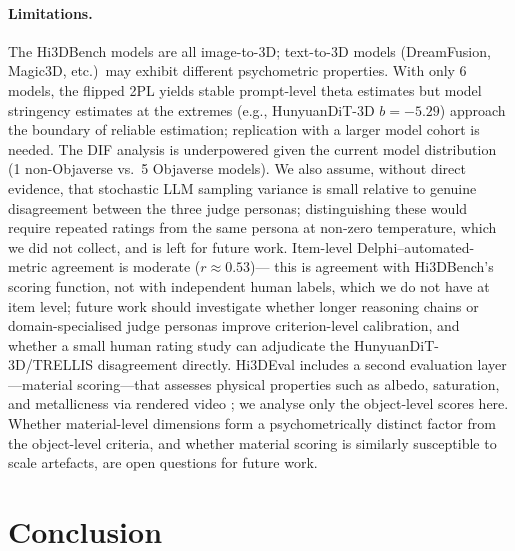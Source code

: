 \documentclass[10pt]{article}
\begin{document}
\paragraph{Limitations.}
The Hi3DBench models are all image-to-3D; text-to-3D models (DreamFusion,
Magic3D, etc.)\ may exhibit different psychometric properties.
With only 6 models, the flipped 2PL yields stable prompt-level theta estimates
but model stringency estimates at the extremes (e.g., HunyuanDiT-3D $b=-5.29$)
approach the boundary of reliable estimation; replication with a larger model
cohort is needed.
The DIF analysis is underpowered given the current model distribution (1
non-Objaverse vs.\ 5 Objaverse models).
We also assume, without direct evidence, that stochastic LLM sampling
variance is small relative to genuine disagreement between the three
judge personas; distinguishing these would require repeated ratings from
the same persona at non-zero temperature, which we did not collect, and
is left for future work.
Item-level Delphi--automated-metric agreement is moderate ($r\approx0.53$)---
this is agreement with Hi3DBench's scoring function, not with independent
human labels, which we do not have at item level; future work should
investigate whether longer reasoning chains or domain-specialised judge
personas improve criterion-level calibration, and whether a small human
rating study can adjudicate the HunyuanDiT-3D/TRELLIS disagreement directly.
Hi3DEval includes a second evaluation layer---material scoring---that assesses
physical properties such as albedo, saturation, and metallicness via rendered
video \citep{hi3deval2025}; we analyse only the object-level scores here.
Whether material-level dimensions form a psychometrically distinct factor
from the object-level criteria, and whether material scoring is similarly
susceptible to scale artefacts, are open questions for future work.

\section{Conclusion}
\label{sec:conclusion}
\end{document}
